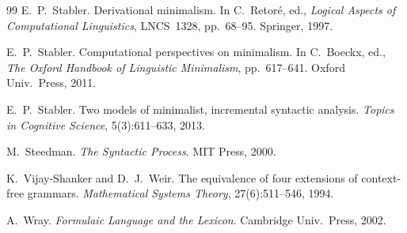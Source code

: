 \documentclass[12pt,a4paper]{article}
\begin{document}
\begin{thebibliography}{99}
E.~P.~Stabler.
\newblock Derivational minimalism.
\newblock In C.~Retor\'{e}, ed., \emph{Logical Aspects of Computational Linguistics}, LNCS~1328, pp.~68--95. Springer, 1997.

E.~P.~Stabler.
\newblock Computational perspectives on minimalism.
\newblock In C.~Boeckx, ed., \emph{The Oxford Handbook of Linguistic Minimalism}, pp.~617--641. Oxford Univ.\ Press, 2011.

E.~P.~Stabler.
\newblock Two models of minimalist, incremental syntactic analysis.
\newblock \emph{Topics in Cognitive Science}, 5(3):611--633, 2013.

M.~Steedman.
\newblock \emph{The Syntactic Process}.
\newblock MIT Press, 2000.

K.~Vijay-Shanker and D.~J.~Weir.
\newblock The equivalence of four extensions of context-free grammars.
\newblock \emph{Mathematical Systems Theory}, 27(6):511--546, 1994.

A.~Wray.
\newblock \emph{Formulaic Language and the Lexicon}.
\newblock Cambridge Univ.\ Press, 2002.

\end{thebibliography}
\end{document}
